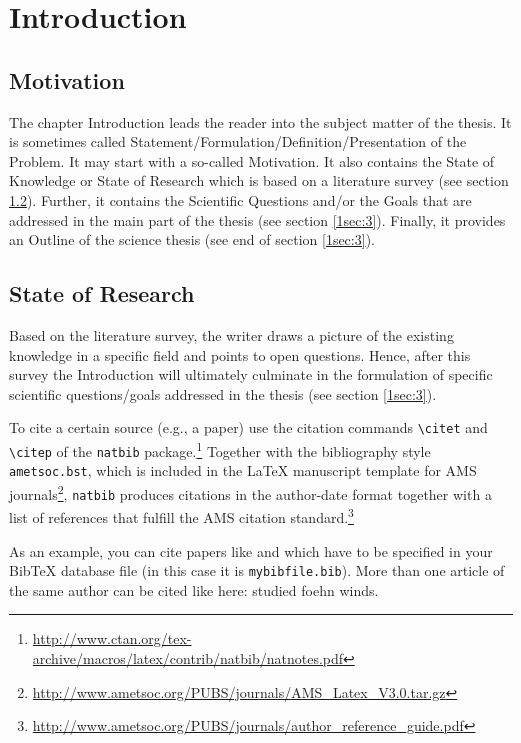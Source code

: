 \chapter{Introduction}\label{chap1}
\thispagestyle{plain}

\section{Motivation}
The chapter Introduction leads the reader into the subject matter
of the thesis. It is sometimes called
Statement/Formulation/Definition/Presentation of the Problem. It may start with
a so-called Motivation. It also contains the State of Knowledge or State
of Research which is based on a literature survey (see section \ref{1sec:2}).
Further, it contains the Scientific Questions and/or the Goals that are
addressed in the main part of the thesis (see section \ref{1sec:3}). Finally,
it provides an Outline of the science thesis (see end of section \ref{1sec:3}).


\section{State of Research}\label{1sec:2}

Based on the literature survey, the writer draws a picture of the existing
knowledge in a specific field and points to open questions. Hence, after this
survey the Introduction will ultimately culminate in the formulation of specific
scientific questions/goals addressed in the thesis (see section \ref{1sec:3}).

To cite a certain source (e.g., a paper) use the citation commands
\verb|\citet| and \verb|\citep| of the \verb|natbib|
package.\footnote{
\url{http://www.ctan.org/tex-archive/macros/latex/contrib/natbib/natnotes.pdf}}
Together with the bibliography style \verb|ametsoc.bst|, which is
included in the \LaTeX{} manuscript template for AMS journals\footnote{
\url{http://www.ametsoc.org/PUBS/journals/AMS_Latex_V3.0.tar.gz}}, \verb|natbib|
produces citations in the author-date format together with a list of
references that fulfill the AMS citation standard.\footnote{
\url{http://www.ametsoc.org/PUBS/journals/author_reference_guide.pdf}}

As an example, you can cite papers like \citet{hann66Aag} and \citet{scha93Aag}
which have to be specified in your BibTeX database file (in this case it is
\verb|mybibfile.bib|). More than one article of the same author can be cited
like here: \citet{hoin85Aag,hoin90Aag} studied foehn winds.

